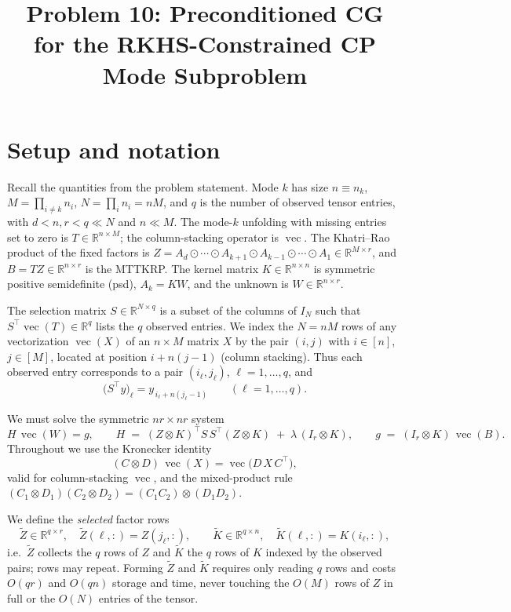 \documentclass[12pt]{article}
\title{Problem 10: Preconditioned CG for the RKHS-Constrained CP Mode Subproblem}
\author{}
\date{}
\DeclareMathOperator{\vecop}{vec}
\newcommand{\bR}{\mathbb{R}}
\newcommand{\KR}{\odot}     %
\newcommand{\tZ}{\tilde Z}
\newcommand{\tK}{\tilde K}
\theoremstyle{definition}
\begin{document}
\maketitle

\section{Setup and notation}

Recall the quantities from the problem statement. Mode $k$ has size $n\equiv n_k$,
$M=\prod_{i\neq k}n_i$, $N=\prod_i n_i=nM$, and $q$ is the number of observed
tensor entries, with $d<n,r<q\ll N$ and $n\ll M$. The mode-$k$ unfolding with
missing entries set to zero is $T\in\bR^{n\times M}$; the column-stacking
operator is $\vecop$. The Khatri--Rao product of the fixed factors is
$Z=A_d\KR\cdots\KR A_{k+1}\KR A_{k-1}\KR\cdots\KR A_1\in\bR^{M\times r}$, and
$B=TZ\in\bR^{n\times r}$ is the MTTKRP. The kernel matrix $K\in\bR^{n\times n}$ is
symmetric positive semidefinite (psd), $A_k=KW$, and the unknown is
$W\in\bR^{n\times r}$.

The selection matrix $S\in\bR^{N\times q}$ is a subset of the columns of $I_N$
such that $S^\top\vecop(T)\in\bR^q$ lists the $q$ observed entries. We index the
$N=nM$ rows of any vectorization $\vecop(X)$ of an $n\times M$ matrix $X$ by the
pair $(i,j)$ with $i\in[n]$, $j\in[M]$, located at position $i+n(j-1)$
(column stacking). Thus each observed entry corresponds to a pair $(i_\ell,j_\ell)$,
$\ell=1,\dots,q$, and
\begin{equation}\label{eq:Sdef}
\big(S^\top y\big)_\ell = y_{\,i_\ell + n(j_\ell-1)}\qquad (\ell=1,\dots,q).
\end{equation}

We must solve the symmetric $nr\times nr$ system
\begin{equation}\label{eq:system}
H\,\vecop(W)=g,\qquad
H \;=\; (Z\otimes K)^\top S\,S^\top(Z\otimes K)\;+\;\lambda\,(I_r\otimes K),
\qquad
g \;=\; (I_r\otimes K)\,\vecop(B).
\end{equation}
Throughout we use the Kronecker identity
\begin{equation}\label{eq:kronvec}
(C\otimes D)\,\vecop(X)=\vecop\!\big(D\,X\,C^\top\big),
\end{equation}
valid for column-stacking $\vecop$, and the mixed-product rule
$(C_1\otimes D_1)(C_2\otimes D_2)=(C_1C_2)\otimes(D_1D_2)$.

We define the \emph{selected} factor rows
\begin{equation}\label{eq:tilde}
\tZ\in\bR^{q\times r},\quad \tZ(\ell,:)=Z(j_\ell,:),
\qquad
\tK\in\bR^{q\times n},\quad \tK(\ell,:)=K(i_\ell,:),
\end{equation}
i.e.\ $\tZ$ collects the $q$ rows of $Z$ and $\tK$ the $q$ rows of $K$ indexed by
the observed pairs; rows may repeat. Forming $\tZ$ and $\tK$ requires only reading
$q$ rows and costs $O(qr)$ and $O(qn)$ storage and time, never touching the
$O(M)$ rows of $Z$ in full or the $O(N)$ entries of the tensor.
\end{document}
